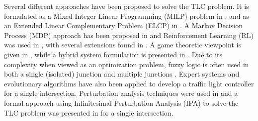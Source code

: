 \documentclass{ifacconf}\usepackage{graphicx}
\begin{document}
Several different approaches have been proposed to solve the TLC problem. It
is formulated as a Mixed Integer Linear Programming (MILP) problem in
\cite{Dujardin11}, and as an Extended Linear Complementary Problem (ELCP) in
\cite{Schutter99}. A Markov Decision Process (MDP) approach has been proposed
in \cite{Yu06} and Reinforcement Learning (RL) was used in \cite{Thorpe97},
with several extensions found in \cite{Prashanth11, Wiering04}. A game
theoretic viewpoint is given in \cite{Alvarez10}, while a hybrid system
formulation is presented in \cite{Zhao03}. Due to its complexity when viewed
as an optimization problem, fuzzy logic is often used in both a single
(isolated) junction \cite{Murat05} and multiple junctions \cite{Choi02}.
Expert systems \cite{Findler92} and evolutionary algorithms \cite{Taale98}
have also been applied to develop a traffic light controller for a single
intersection. Perturbation analysis techniques were used in \cite{Head96} and
a formal approach using Infinitesimal Perturbation Analysis (IPA) to solve the
TLC problem was presented in \cite{Panayiotou05} for a single intersection.
\end{document}

